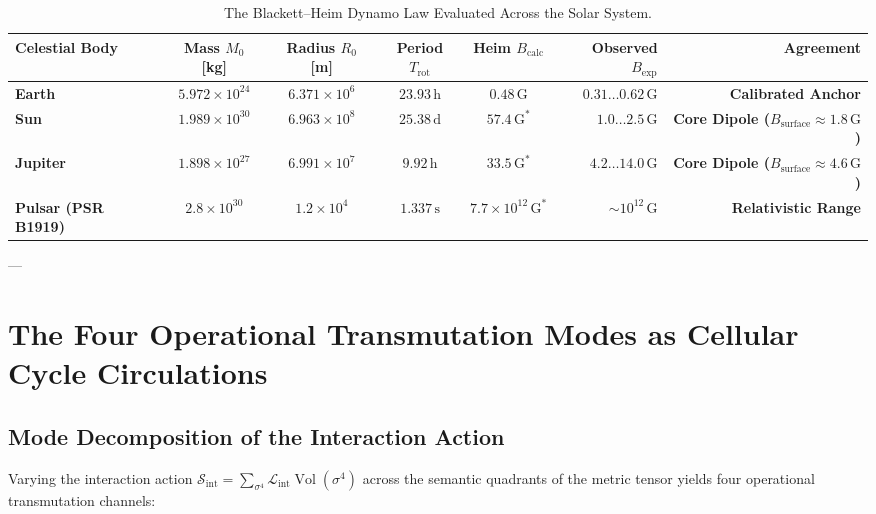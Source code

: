 \documentclass[
    12pt,
    a4paper,
    headings=normal,
    twoside=false,
    open=any,
    parskip=half
]{scrbook}
\DeclareMathOperator{\vol}{Vol}
\begin{document}
\begin{table}[htbp]
\centering
\small
\caption{The Blackett--Heim Dynamo Law Evaluated Across the Solar System.}
\label{tab:ch6_blackett_heim_solar_system}
\begin{adjustbox}{max width=\textwidth}
\begin{tabular}{lccccrr}\toprule
\textbf{Celestial Body} & \textbf{Mass $M_0$ [kg]} & \textbf{Radius $R_0$ [m]} & \textbf{Period $T_{\text{rot}}$} & \textbf{Heim $B_{\text{calc}}$} & \textbf{Observed $B_{\text{exp}}$} & \textbf{Agreement} \\\midrule
\rowcolor{secondarycolor!8}
\textbf{Earth} & $5.972 \times 10^{24}$ & $6.371 \times 10^6$ & $23.93\,\text{h}$ & $0.48\,\text{G}$ & $0.31 \dots 0.62\,\text{G}$ & \textbf{Calibrated Anchor} \\
\textbf{Sun} & $1.989 \times 10^{30}$ & $6.963 \times 10^8$ & $25.38\,\text{d}$ & $57.4\,\text{G}^{*}$ & $1.0 \dots 2.5\,\text{G}$ & \textbf{Core Dipole ($B_{\text{surface}} \approx 1.8\,\text{G}$)} \\
\rowcolor{secondarycolor!8}
\textbf{Jupiter} & $1.898 \times 10^{27}$ & $6.991 \times 10^7$ & $9.92\,\text{h}$ & $33.5\,\text{G}^{*}$ & $4.2 \dots 14.0\,\text{G}$ & \textbf{Core Dipole ($B_{\text{surface}} \approx 4.6\,\text{G}$)} \\
\textbf{Pulsar (PSR B1919)} & $2.8 \times 10^{30}$ & $1.2 \times 10^4$ & $1.337\,\text{s}$ & $7.7 \times 10^{12}\,\text{G}^{*}$ & $\sim 10^{12}\,\text{G}$ & \textbf{Relativistic Range} \\\bottomrule
\end{tabular}
\end{adjustbox}
\end{table}

---

\section{The Four Operational Transmutation Modes as Cellular Cycle Circulations}
\label{sec:ch6_four_operational_transmutation_modes_expanded}

\subsection{Mode Decomposition of the Interaction Action}

Varying the interaction action $\mathcal{S}_{\text{int}} = \sum_{\sigma^4} \mathcal{L}_{\text{int}} \vol(\sigma^4)$ across the semantic quadrants of the metric tensor yields four operational transmutation channels:
\end{document}
